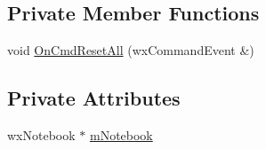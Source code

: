\subsection*{Private Member Functions}
\begin{DoxyCompactItemize}
\item 
void \hyperlink{a00025_aa21276d4de4b8770aee283bb2fe7652c}{On\-Cmd\-Reset\-All} (wx\-Command\-Event \&)
\end{DoxyCompactItemize}
\subsection*{Private Attributes}
\begin{DoxyCompactItemize}
\item 
wx\-Notebook $\ast$ \hyperlink{a00025_a27535ea08c2c16709650a92e74ced8c3}{m\-Notebook}
\end{DoxyCompactItemize}


